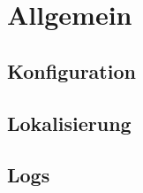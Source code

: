 \chapter{Allgemein}
\label{allgemein}

\section{Konfiguration}
\label{konfiguration}
\section{Lokalisierung}
\label{lokalisierung}
\section{Logs}
\label{logs}

